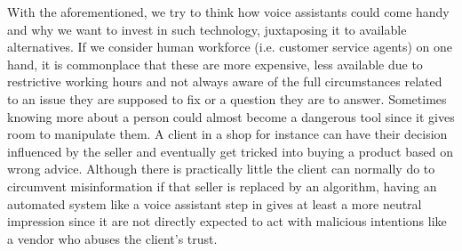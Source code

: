%
With the aforementioned, we try to think how voice assistants could come handy and why we want to invest in such technology, juxtaposing it to available alternatives.
If we consider human workforce (i.e. customer service agents) on one hand, it is commonplace that these are more expensive, less available due to restrictive working hours and not always aware of the full circumstances related to an issue they are supposed to fix or a question they are to answer. 
Sometimes knowing more about a person could almost become a dangerous tool since it gives room to manipulate them. 
A client in a shop for instance can have their decision influenced by the seller and eventually get tricked into buying a product based on wrong advice.
Although there is practically little the client can normally do to circumvent misinformation if that seller is replaced by an algorithm, having an automated system like a voice assistant step in gives at least a more neutral impression since it are not directly expected to act with malicious intentions like a vendor who abuses the client's trust.\\

